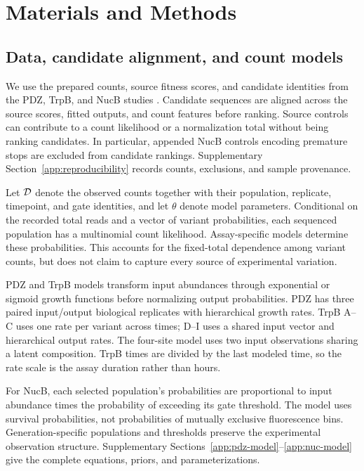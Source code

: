 \section{Materials and Methods}
\label{sec:methods}

\subsection{Data, candidate alignment, and count models}

We use the prepared counts, source fitness scores, and candidate identities
from the PDZ, TrpB, and NucB studies
\citep{zarin2024,johnston2024,thomas2025}. Candidate sequences are aligned
across the source scores, fitted outputs, and count features before
ranking. Source controls can contribute to a count likelihood or a
normalization total without being ranking candidates. In particular,
appended NucB controls encoding premature stops are excluded from candidate
rankings. Supplementary Section~\ref{app:reproducibility} records counts,
exclusions, and sample provenance.

Let $\mathcal{D}$ denote the observed counts together with their population,
replicate, timepoint, and gate identities, and let $\theta$ denote model
parameters. Conditional on the recorded total reads and a vector of
variant probabilities, each sequenced population has a multinomial
count likelihood. Assay-specific models determine these probabilities.
This accounts for the fixed-total dependence among variant counts,
but does not claim to capture every source of experimental variation.

PDZ and TrpB models transform input abundances through exponential
or sigmoid growth functions before normalizing output probabilities.
PDZ has three paired input/output biological replicates with hierarchical
growth rates. TrpB A--C uses one rate per variant across times;
D--I uses a shared input vector and hierarchical output rates.
The four-site model uses two input observations sharing a latent
composition. TrpB times are divided by the last modeled time, so
the rate scale is the assay duration rather than hours.

For NucB, each selected population's probabilities are proportional
to input abundance times the probability of exceeding its gate
threshold. The model uses survival probabilities, not probabilities
of mutually exclusive fluorescence bins. Generation-specific
populations and thresholds preserve the experimental observation
structure. Supplementary Sections~\ref{app:pdz-model}--\ref{app:nuc-model}
give the complete equations, priors, and parameterizations.

